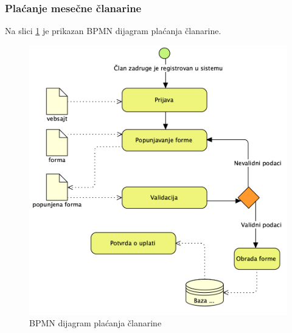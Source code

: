 \documentclass[a4paper]{article}
\begin{document}
\subsubsection{Plaćanje mesečne članarine}
Na slici \ref{bpmn_mesecna_clanarina} je prikazan BPMN dijagram plaćanja članarine.
\begin{figure}[h!]
    \centering
    \includegraphics[scale=0.64]{images/bpmn_mesecna_clanarina.png}
    \caption{BPMN dijagram plaćanja članarine}
    \label{bpmn_mesecna_clanarina}
\end{figure}
\clearpage
\end{document}
